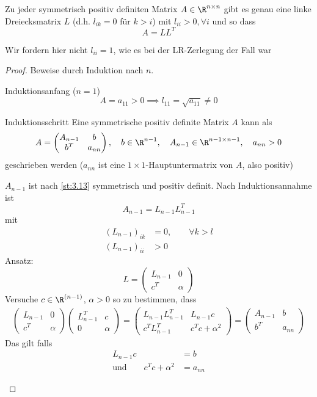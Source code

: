 \documentclass{mycourse}
\begin{document}
\begin{st}
	\label{st:3.14}
	Zu jeder symmetrisch positiv definiten Matrix $A\in \R^{n\times n}$ gibt es genau eine linke Dreiecksmatrix $L$ (d.h. $l_{ik} = 0$ für $k>i$) mit $l_{ii} > 0, \forall i$ und so dass 
	\[
		A = LL^T
	\]
	\begin{note}
		Wir fordern hier nicht $l_{ii}=1$, wie es bei der LR-Zerlegung der Fall war
	\end{note}
	\begin{proof}
		Beweise durch Induktion nach $n$.

		\begin{seg}{Induktionsanfang ($n=1$)}
		\[
			A = a_{11} > 0 \implies l_{11} = \sqrt{a_{11}} \neq 0
		\]
		\end{seg}
		\begin{seg}{Induktionsschritt}
		Eine symmetrische positiv definite Matrix $A$ kann als
		\[
			A = \begin{pmatrix} A_{n-1} & b \\ b^T & a_{nn}\end{pmatrix},\quad b\in \R^{n-1},\quad A_{n-1}\in \R^{n-1\times n-1},\quad a_{nn} > 0
		\]
		geschrieben werden ($a_{nn}$ ist eine $1\times 1$-Hauptuntermatrix von $A$, also positiv)

		$A_{n-1}$ ist nach \ref{st:3.13} symmetrisch und positiv definit.
		Nach Induktionsannahme ist
		\[
			A_{n-1} = L_{n-1}L_{n-1}^T
		\]
		mit
		\begin{align*}
			(L_{n-1})_{ik} &= 0, \qquad \forall k > l\\
			(L_{n-1})_{ii} &> 0
		\end{align*}
		Ansatz:
		\[
			L = \begin{pmatrix} L_{n-1} & 0 \\ c^T & \alpha \end{pmatrix}
		\]
		Versuche $c\in \R^{(n-1)}$, $\alpha > 0$ so zu bestimmen, dass
		\begin{align}
			\label{eq:3.14.6}
			\begin{pmatrix}L_{n-1} & 0 \\ c^T & \alpha\end{pmatrix}
			\begin{pmatrix}L_{n-1}^T & c \\ 0 & \alpha\end{pmatrix}
			= \begin{pmatrix}L_{n-1}L_{n-1}^T & L_{n-1}c \\ c^TL_{n-1}^T & c^Tc + \alpha^2\end{pmatrix}
			= \begin{pmatrix}A_{n-1} & b \\ b^T & a_{nn}\end{pmatrix}
		\end{align}
		Das gilt falls
		\begin{align}
			L_{n-1}c &= b \tag{3.6b}\\
			\label{eq:3.14.6b}
	\text{und}\qquad c^Tc + \alpha^2 &= a_{nn}
		\end{align}


\end{seg}
\end{proof}
\end{st}
\end{document}
